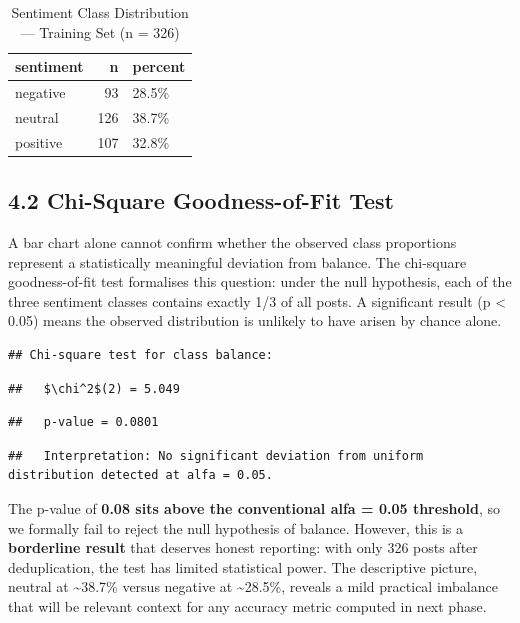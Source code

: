 \documentclass[
]{article}
\begin{document}
\begin{longtable}[t]{lrl}
\caption{\label{tab:sentiment-dist}Sentiment Class Distribution — Training Set (n = 326)}\\
\toprule
sentiment & n & percent\\
\midrule
negative & 93 & 28.5\%\\
neutral & 126 & 38.7\%\\
positive & 107 & 32.8\%\\
\bottomrule
\end{longtable}

\subsection{4.2 Chi-Square Goodness-of-Fit
Test}\label{chi-square-goodness-of-fit-test}

A bar chart alone cannot confirm whether the observed class proportions
represent a statistically meaningful deviation from balance. The
chi-square goodness-of-fit test formalises this question: under the null
hypothesis, each of the three sentiment classes contains exactly 1/3 of
all posts. A significant result (p \textless{} 0.05) means the observed
distribution is unlikely to have arisen by chance alone.

\begin{verbatim}
## Chi-square test for class balance:
\end{verbatim}

\begin{verbatim}
##   $\chi^2$(2) = 5.049
\end{verbatim}

\begin{verbatim}
##   p-value = 0.0801
\end{verbatim}

\begin{verbatim}
##   Interpretation: No significant deviation from uniform distribution detected at alfa = 0.05.
\end{verbatim}

The p-value of \textbf{0.08 sits above the conventional alfa = 0.05
threshold}, so we formally fail to reject the null hypothesis of
balance. However, this is a \textbf{borderline result} that deserves
honest reporting: with only 326 posts after deduplication, the test has
limited statistical power. The descriptive picture, neutral at
\textasciitilde38.7\% versus negative at \textasciitilde28.5\%, reveals
a mild practical imbalance that will be relevant context for any
accuracy metric computed in next phase.
\end{document}
